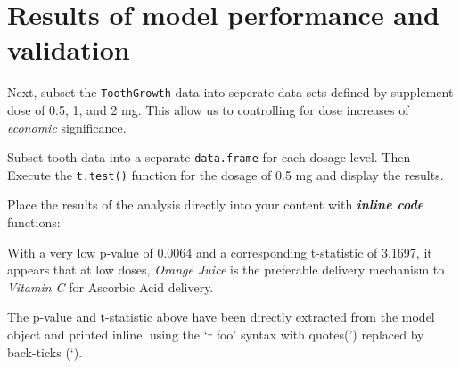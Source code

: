 \documentclass[12pt,oneside]{chicagocapstone}
\newenvironment{Shaded}{\begin{snugshade}}{\end{snugshade}}
\newcommand{\KeywordTok}[1]{\textcolor[rgb]{0.13,0.29,0.53}{\textbf{#1}}}
\newcommand{\DataTypeTok}[1]{\textcolor[rgb]{0.13,0.29,0.53}{#1}}
\newcommand{\DecValTok}[1]{\textcolor[rgb]{0.00,0.00,0.81}{#1}}
\newcommand{\FloatTok}[1]{\textcolor[rgb]{0.00,0.00,0.81}{#1}}
\newcommand{\StringTok}[1]{\textcolor[rgb]{0.31,0.60,0.02}{#1}}
\newcommand{\OperatorTok}[1]{\textcolor[rgb]{0.81,0.36,0.00}{\textbf{#1}}}
\newcommand{\NormalTok}[1]{#1}
\begin{document}
\section*{Results of model performance and
validation}\label{results-of-model-performance-and-validation}

Next, subset the \texttt{ToothGrowth} data into seperate data sets
defined by supplement dose of 0.5, 1, and 2 mg. This allow us to
controlling for dose increases of \emph{economic} significance.

Subset tooth data into a separate \texttt{data.frame} for each dosage
level. Then Execute the \texttt{t.test()} function for the dosage of 0.5
mg and display the results.
\begin{Shaded}
\end{Shaded}
Place the results of the analysis directly into your content with
\textbf{\emph{inline code}} functions:

With a very low p-value of 0.0064 and a corresponding t-statistic of
3.1697, it appears that at low doses, \emph{Orange Juice} is the
preferable delivery mechanism to \emph{Vitamin C} for Ascorbic Acid
delivery.

The p-value and t-statistic above have been directly extracted from the
model object and printed inline. using the `r foo' syntax with quotes(')
replaced by back-ticks (`).
\end{document}
